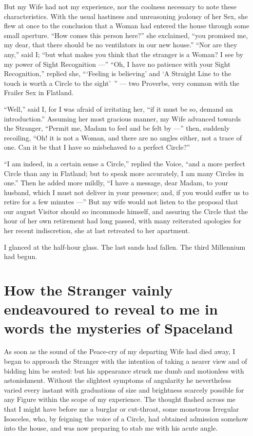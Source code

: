 \documentclass[10pt, kindle, oneside]{kindle}
\begin{document}
But my Wife had not my experience, nor the coolness necessary to note these
characteristics. With the usual hastiness and unreasoning jealousy of her Sex,
she flew at once to the conclusion that a Woman had entered the house through
some small aperture. ``How comes this person here?'' she exclaimed, ``you
promised me, my dear, that there should be no ventilators in our new house.''
``Nor are they any,'' said I; ``but what makes you think that the stranger is a
Woman? I see by my power of Sight Recognition ---'' ``Oh, I have no patience with
your Sight Recognition,'' replied she, ```Feeling is believing' and `A Straight
Line to the touch is worth a Circle to the sight'\, '' --- two Proverbs, very common
with the Frailer Sex in Flatland.

``Well,'' said I, for I was afraid of irritating her, ``if it must be so, demand
an introduction.'' Assuming her most gracious manner, my Wife advanced towards
the Stranger, ``Permit me, Madam to feel and be felt by ---'' then, suddenly
recoiling, ``Oh! it is not a Woman, and there are no angles either, not a trace
of one. Can it be that I have so misbehaved to a perfect Circle?''

``I am indeed, in a certain sense a Circle,'' replied the Voice, ``and a more
perfect Circle than any in Flatland; but to speak more accurately, I am many
Circles in one.'' Then he added more mildly, ``I have a message, dear Madam, to
your husband, which I must not deliver in your presence; and, if you would
suffer us to retire for a few minutes ---'' But my wife would not listen to the
proposal that our august Visitor should so incommode himself, and assuring the
Circle that the hour of her own retirement had long passed, with many
reiterated apologies for her recent indiscretion, she at last retreated to her
apartment.

I glanced at the half-hour glass. The last sands had fallen. The third
Millennium had begun.


\chapter{How the Stranger vainly endeavoured to reveal to me in words the mysteries of Spaceland}


As soon as the sound of the Peace-cry of my departing Wife had died away, I
began to approach the Stranger with the intention of taking a nearer view and
of bidding him be seated: but his appearance struck me dumb and motionless
with astonishment. Without the slightest symptoms of angularity he
nevertheless varied every instant with graduations of size and brightness
scarcely possible for any Figure within the scope of my experience. The
thought flashed across me that I might have before me a burglar or cut-throat,
some monstrous Irregular Isosceles, who, by feigning the voice of a Circle,
had obtained admission somehow into the house, and was now preparing to stab
me with his acute angle.
\end{document}
